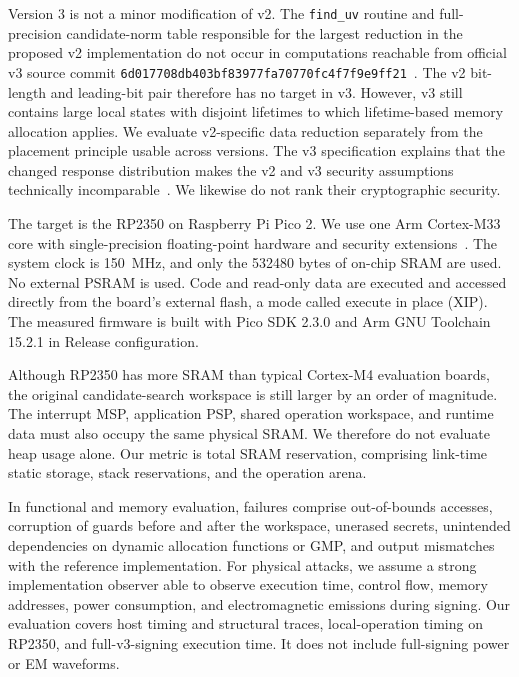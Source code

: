 \documentclass[a4paper,10pt]{article}
\theoremstyle{definition}
\theoremstyle{remark}
\begin{document}
Version 3 is not a minor modification of v2. The \texttt{find\_uv} routine and full-precision candidate-norm table responsible for the largest reduction in the proposed v2 implementation do not occur in computations reachable from official v3 source commit \texttt{6d017708db403bf83977fa70770fc4f7f9e9ff21}~\cite{sqisign-code-v3}. The v2 bit-length and leading-bit pair therefore has no target in v3. However, v3 still contains large local states with disjoint lifetimes to which lifetime-based memory allocation applies. We evaluate v2-specific data reduction separately from the placement principle usable across versions. The v3 specification explains that the changed response distribution makes the v2 and v3 security assumptions technically incomparable~\cite{sqisign-spec-v3}. We likewise do not rank their cryptographic security.

The target is the RP2350 on Raspberry Pi Pico 2. We use one Arm Cortex-M33 core with single-precision floating-point hardware and security extensions~\cite{rp2350-datasheet}. The system clock is \SI{150}{\mega\hertz}, and only the \num{532480} bytes of on-chip SRAM are used. No external PSRAM is used. Code and read-only data are executed and accessed directly from the board's external flash, a mode called execute in place (XIP). The measured firmware is built with Pico SDK 2.3.0 and Arm GNU Toolchain 15.2.1 in Release configuration.

Although RP2350 has more SRAM than typical Cortex-M4 evaluation boards, the original candidate-search workspace is still larger by an order of magnitude. The interrupt MSP, application PSP, shared operation workspace, and runtime data must also occupy the same physical SRAM. We therefore do not evaluate heap usage alone. Our metric is total SRAM reservation, comprising link-time static storage, stack reservations, and the operation arena.

\label{sec:threat-model}

In functional and memory evaluation, failures comprise out-of-bounds accesses, corruption of guards before and after the workspace, unerased secrets, unintended dependencies on dynamic allocation functions or GMP, and output mismatches with the reference implementation. For physical attacks, we assume a strong implementation observer able to observe execution time, control flow, memory addresses, power consumption, and electromagnetic emissions during signing. Our evaluation covers host timing and structural traces, local-operation timing on RP2350, and full-v3-signing execution time. It does not include full-signing power or EM waveforms.
\end{document}
